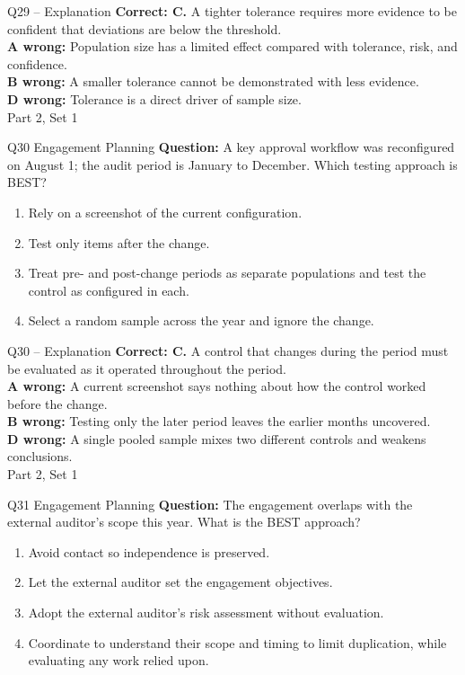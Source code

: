 \documentclass[aspectratio=169,10pt]{beamer}
\begin{document}
\begin{frame}[t]{Q29 -- Explanation}
	\footnotesize
	\textbf{Correct: C.} A tighter tolerance requires more evidence to be confident that deviations are below the threshold. \\[5pt]
\textbf{A wrong:} Population size has a limited effect compared with tolerance, risk, and confidence. \\[3pt]
\textbf{B wrong:} A smaller tolerance cannot be demonstrated with less evidence. \\[3pt]
\textbf{D wrong:} Tolerance is a direct driver of sample size. \\[3pt]
	\vfill {\tiny Part 2, Set 1}
\end{frame}
\begin{frame}[t]{Q30 \hfill {\scriptsize Engagement Planning}}
	\small
	\textbf{Question:} A key approval workflow was reconfigured on August 1; the audit period is January to December. Which testing approach is BEST?
	\begin{enumerate}[label=\Alph*.,itemsep=1pt,topsep=3pt]
			\item Rely on a screenshot of the current configuration.
			\item Test only items after the change.
			\item Treat pre- and post-change periods as separate populations and test the control as configured in each.
			\item Select a random sample across the year and ignore the change.
	\end{enumerate}
\end{frame}
\begin{frame}[t]{Q30 -- Explanation}
	\footnotesize
	\textbf{Correct: C.} A control that changes during the period must be evaluated as it operated throughout the period. \\[5pt]
\textbf{A wrong:} A current screenshot says nothing about how the control worked before the change. \\[3pt]
\textbf{B wrong:} Testing only the later period leaves the earlier months uncovered. \\[3pt]
\textbf{D wrong:} A single pooled sample mixes two different controls and weakens conclusions. \\[3pt]
	\vfill {\tiny Part 2, Set 1}
\end{frame}
\begin{frame}[t]{Q31 \hfill {\scriptsize Engagement Planning}}
	\small
	\textbf{Question:} The engagement overlaps with the external auditor's scope this year. What is the BEST approach?
	\begin{enumerate}[label=\Alph*.,itemsep=1pt,topsep=3pt]
			\item Avoid contact so independence is preserved.
			\item Let the external auditor set the engagement objectives.
			\item Adopt the external auditor's risk assessment without evaluation.
			\item Coordinate to understand their scope and timing to limit duplication, while evaluating any work relied upon.
	\end{enumerate}
\end{frame}
\end{document}
